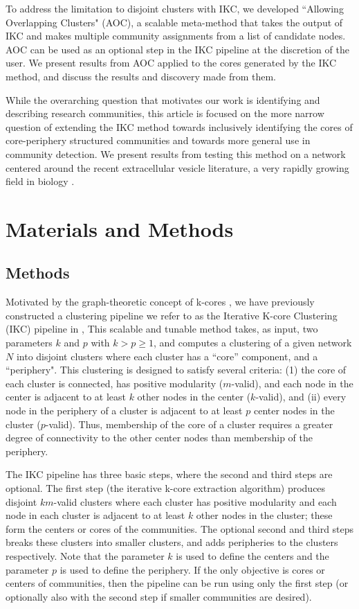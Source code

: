 \documentclass[12pt, oneside]{article}   	%
\begin{document}
To address the limitation to disjoint clusters with IKC, we developed  ``Allowing Overlapping Clusters" (AOC), a scalable meta-method that takes the output of IKC and makes multiple community assignments from a list of candidate nodes. AOC can be used as an optional step in the IKC pipeline at the discretion of the user. We present results from AOC applied to the cores generated by the IKC method, and discuss the results and discovery made from them. 

While the overarching question that motivates our work is identifying and describing research communities, this article is focused on the more narrow question of extending the IKC method towards inclusively identifying the cores of core-periphery structured communities and towards more general use in community detection. We present results from testing this method on a network centered around the recent extracellular vesicle literature, a very rapidly growing field in biology \citep{van2022challenges}. 
 
\section{Materials and Methods}

\subsection{Methods} Motivated by the graph-theoretic concept of k-cores \citep{Giatsidis2011,malliaros2019}, we have previously constructed a clustering pipeline we refer to as  the Iterative K-core Clustering (IKC) pipeline in \cite{Wedell2022}, This scalable and tunable method takes, as input, two parameters $k$ and $p$ with $k > p \geq 1$, and computes a clustering of a given network $N$ into disjoint clusters where each cluster has a ``core'' component, and a ``periphery". This clustering is designed to satisfy several criteria: (1) the core of each cluster is connected,  has positive modularity ($m$-valid), and each node in the center  is adjacent to at least $k$ other nodes in the center ($k$-valid), and (ii) every node in the periphery of a cluster is adjacent to at least $p$ center nodes in the cluster ($p$-valid). Thus, membership of the core of a cluster requires a greater degree of connectivity to the other center nodes than membership of the periphery. 

The IKC pipeline has three basic steps, where the second and third steps are optional.  The first step (the iterative k-core extraction algorithm) produces disjoint $km$-valid clusters where each cluster has positive modularity and each node in each cluster is adjacent to at least $k$ other nodes in the cluster; these form the centers or cores of the communities. The optional second and third steps breaks these clusters into smaller clusters, and adds peripheries to the clusters respectively.  Note that the parameter $k$ is used to define the centers and the parameter $p$ is used to define the periphery. If the only objective is cores or centers of communities, then the pipeline can be run using only the first step (or optionally also with the second step if smaller communities are desired).
\end{document}
